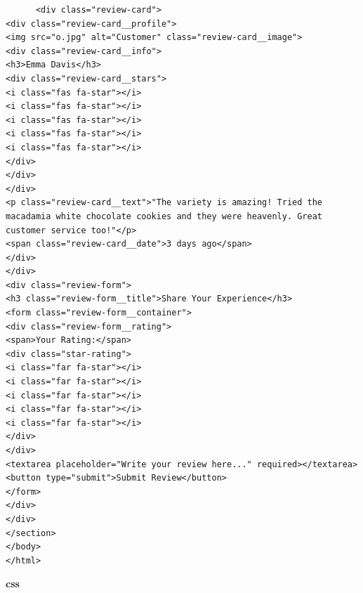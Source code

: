 \documentclass{report}
\begin{document}
\begin{verbatim}
      <div class="review-card">
<div class="review-card__profile">
<img src="o.jpg" alt="Customer" class="review-card__image">
<div class="review-card__info">
<h3>Emma Davis</h3>
<div class="review-card__stars">
<i class="fas fa-star"></i>
<i class="fas fa-star"></i>
<i class="fas fa-star"></i>
<i class="fas fa-star"></i>
<i class="fas fa-star"></i>
</div>
</div>
</div>
<p class="review-card__text">"The variety is amazing! Tried the macadamia white chocolate cookies and they were heavenly. Great customer service too!"</p>
<span class="review-card__date">3 days ago</span>
</div>
</div>
<div class="review-form">
<h3 class="review-form__title">Share Your Experience</h3>
<form class="review-form__container">
<div class="review-form__rating">
<span>Your Rating:</span>
<div class="star-rating">
<i class="far fa-star"></i>
<i class="far fa-star"></i>
<i class="far fa-star"></i>
<i class="far fa-star"></i>
<i class="far fa-star"></i>
</div>
</div>
<textarea placeholder="Write your review here..." required></textarea>
<button type="submit">Submit Review</button>
</form>
</div>
</div>
</section>
</body>
</html>
\end{verbatim}
\textbf{css}
\end{document}
